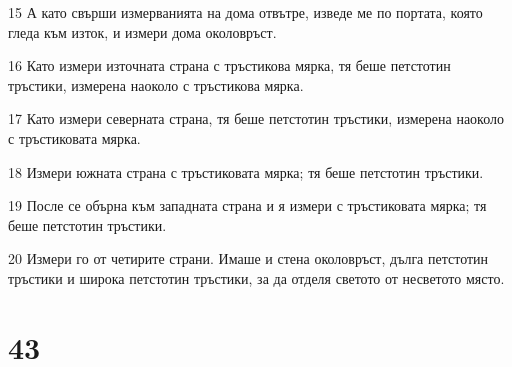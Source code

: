 \par 15 А като свърши измерванията на дома отвътре, изведе ме по портата, която гледа към изток, и измери дома околовръст.
\par 16 Като измери източната страна с тръстикова мярка, тя беше петстотин тръстики, измерена наоколо с тръстикова мярка.
\par 17 Като измери северната страна, тя беше петстотин тръстики, измерена наоколо с тръстиковата мярка.
\par 18 Измери южната страна с тръстиковата мярка; тя беше петстотин тръстики.
\par 19 После се обърна към западната страна и я измери с тръстиковата мярка; тя беше петстотин тръстики.
\par 20 Измери го от четирите страни. Имаше и стена околовръст, дълга петстотин тръстики и широка петстотин тръстики, за да отделя светото от несветото място.

\chapter{43}

